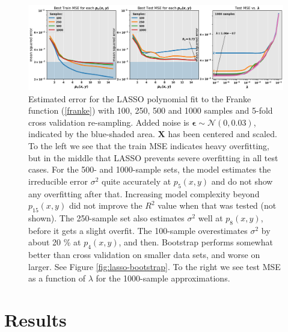 \documentclass[]{article}
\begin{document}
\begin{figure}[!htb]
	\centering
	\includegraphics[width=1\linewidth]{./results/lasso-cv.png}
	\caption{Estimated error for the LASSO polynomial fit to the Franke function (\ref{franke}) with 100, 250, 500 and 1000 samples and 5-fold cross validation re-sampling. Added noise is $\mathbf{\epsilon} \sim \mathcal{N}(0, 0.03)$, indicated by the blue-shaded area. $\mathbf{X}$ has been centered and scaled. To the left we see that the train MSE indicates heavy overfitting, but in the middle that LASSO prevents severe overfitting in all test cases. For the 500- and 1000-sample sets, the model estimates the irreducible error $\sigma^2$ quite accurately at $p_5(x,y)$ and do not show any overfitting after that. Increasing model complexity beyond $p_{15}(x,y)$ did not improve the $R^2$ value when that was tested (not shown). The 250-sample set also estimates $\sigma^2$ well at $p_8(x,y)$, before it gets a slight overfit. The 100-sample overestimates $\sigma^2$ by about 20 \% at $p_4(x,y)$, and then. Bootstrap performs somewhat better than cross validation on smaller data sets, and worse on larger. See Figure \ref{fig:lasso-bootstrap}. To the right we see test MSE as a function of $\lambda$ for the 1000-sample approximations.}
	\label{fig:lasso-cv}
\end{figure}



\section{Results}
\end{document}

